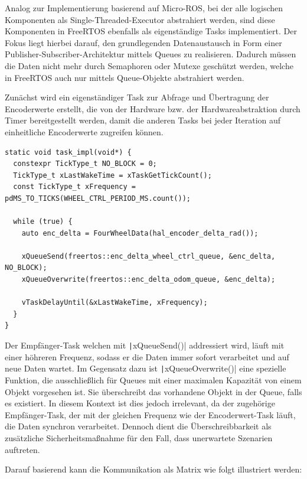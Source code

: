 Analog zur Implementierung basierend auf Micro-ROS, bei der alle logischen
Komponenten als Single-Threaded-Executor abstrahiert werden, sind diese
Komponenten in FreeRTOS ebenfalls als eigenständige Tasks implementiert. Der
Fokus liegt hierbei darauf, den grundlegenden Datenaustausch in Form einer
Publisher-Subscriber-Architektur mittels Queues zu realisieren. Dadurch müssen
die Daten nicht mehr durch Semaphoren oder Mutexe geschützt werden, welche in
FreeRTOS auch nur mittels Queue-Objekte abstrahiert werden.

Zunächst wird ein eigenständiger Task zur Abfrage und Übertragung der
Encoderwerte erstellt, die von der Hardware bzw. der Hardwareabstraktion durch
Timer bereitgestellt werden, damit die anderen Tasks bei jeder Iteration auf
einheitliche Encoderwerte zugreifen können.

\begin{code}
\begin{verbatim}
static void task_impl(void*) {
  constexpr TickType_t NO_BLOCK = 0;
  TickType_t xLastWakeTime = xTaskGetTickCount();
  const TickType_t xFrequency = pdMS_TO_TICKS(WHEEL_CTRL_PERIOD_MS.count());

  while (true) {
    auto enc_delta = FourWheelData(hal_encoder_delta_rad());

    xQueueSend(freertos::enc_delta_wheel_ctrl_queue, &enc_delta, NO_BLOCK);
    xQueueOverwrite(freertos::enc_delta_odom_queue, &enc_delta);

    vTaskDelayUntil(&xLastWakeTime, xFrequency);
  }
}
\end{verbatim}
\end{code}


Der Empfänger-Task welchen mit \texttt|xQueueSend()| addressiert wird,
läuft mit einer höhreren Frequenz, sodass er die Daten immer sofort verarbeitet
und auf neue Daten wartet. Im Gegensatz dazu ist
\texttt|xQueueOverwrite()| eine spezielle Funktion, die ausschließlich
für Queues mit einer maximalen Kapazität von einem Objekt vorgesehen ist. Sie
überschreibt das vorhandene Objekt in der Queue, falls es existiert. In diesem
Kontext ist dies jedoch irrelevant, da der zugehörige Empfänger-Task, der mit
der gleichen Frequenz wie der Encoderwert-Task läuft, die Daten synchron
verarbeitet. Dennoch dient die Überschreibbarkeit als zusätzliche
Sicherheitsmaßnahme für den Fall, dass unerwartete Szenarien auftreten.

Darauf basierend kann die Kommunikation als Matrix wie folgt illustriert werden:

